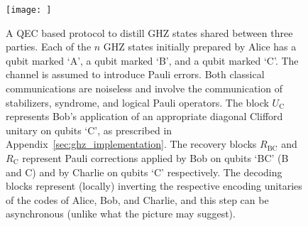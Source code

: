 \documentclass[journal,onecolumn]{IEEEtran}
\begin{document}
\begin{figure}
 \centering
  \texttt{[image: ]}
  \caption{A QEC based protocol to distill GHZ states shared between three parties. Each of the $n$ GHZ states initially prepared by Alice has a qubit marked `A', a qubit marked `B', and a qubit marked `C'. The channel is assumed to introduce Pauli errors. Both classical communications are noiseless and involve the communication of stabilizers, syndrome, and logical Pauli operators. The block $U_{\text{C}}$ represents Bob's application of an appropriate diagonal Clifford unitary on qubits `C', as prescribed in Appendix~\ref{sec:ghz_implementation}. The recovery blocks $R_{\text{BC}}$ and $R_{\text{C}}$ represent Pauli corrections applied by Bob on qubits `BC' (B and C) and by Charlie on qubits `C' respectively. The decoding blocks represent (locally) inverting the respective encoding unitaries of the codes of Alice, Bob, and Charlie, and this step can be asynchronous (unlike what the picture may suggest).}
   \label{fig:ghz-entanglement}
\end{figure}
 
 
 
\end{document}

